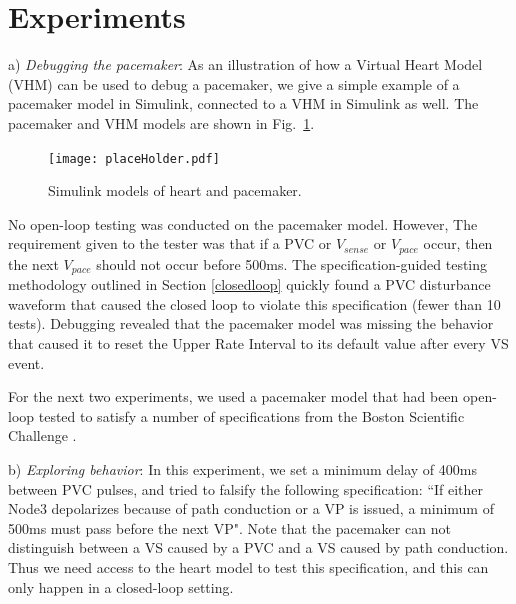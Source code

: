 \section{Experiments}
\label{experiments}

a) \emph{Debugging the pacemaker}: As an illustration of how a Virtual Heart Model (VHM) can be used to debug a pacemaker, we give a simple example of a pacemaker model in Simulink, connected to a VHM in Simulink as well. 
The pacemaker and VHM models are shown in Fig.~\ref{fig:simulinkModels}.
\begin{figure}[tb]
	\centering
	\texttt{[image: placeHolder.pdf]}
	\caption{Simulink models of heart and pacemaker.}
	\label{fig:simulinkModels}
\end{figure}
No open-loop testing was conducted on the pacemaker model.
However, 
The requirement given to the tester was that if a PVC or $V_{sense}$ or $V_{pace}$ occur, then the next $V_{pace}$ should not occur before 500ms. 
The specification-guided testing methodology outlined in Section \ref{closedloop} quickly found a PVC disturbance waveform that caused the closed loop to violate this specification (fewer than 10 tests).
Debugging revealed that the pacemaker model was missing the behavior that caused it to reset the Upper Rate Interval to its default value after every VS event.

For the next two experiments, we used a pacemaker model that had been open-loop tested to satisfy a number of specifications from the Boston Scientific Challenge \cite{challenge}.

b) \emph{Exploring behavior}: In this experiment, we set a minimum delay of 400ms between PVC pulses, and tried to falsify the following specification:
``If either Node3 depolarizes because of path conduction or a VP is issued, a minimum of 500ms must pass before the next VP".
Note that the pacemaker can not distinguish between a VS caused by a PVC and a VS caused by path conduction.
Thus we need access to the heart model to test this specification, and this can only happen in a closed-loop setting.


